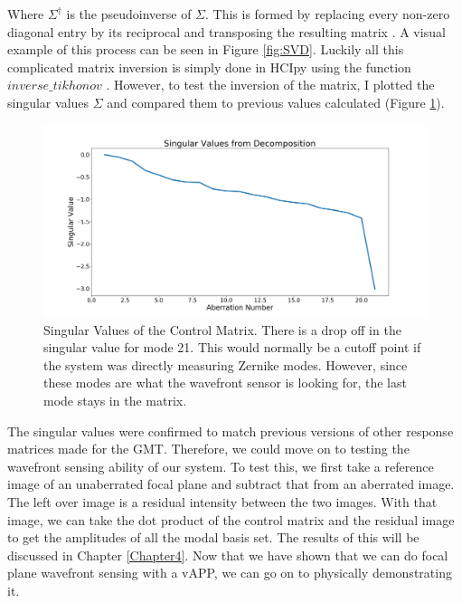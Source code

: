 Where $\Sigma^{\dagger}$ is the pseudoinverse of $\Sigma$.  This is formed by replacing every non-zero diagonal entry by
its reciprocal and transposing the resulting matrix \cite{Hestenes1958InversionResults}.  A visual example of this
process can be seen in Figure \ref{fig:SVD}. Luckily all this complicated matrix inversion is simply done in HCIpy using
the function $inverse\_tikhonov$ \cite{por2018hcipy}.  However, to test the inversion of the matrix, I plotted the
singular values $\Sigma$ and compared them to previous values calculated (Figure \ref{fig:SV}).




\begin{figure}[H]
    \centering
    \includegraphics[width = 14cm]{Figures/singular_values.png}
    \caption{Singular Values of the Control Matrix.  There is a drop off in the singular value for mode 21.  This would normally be a cutoff point if the system was directly measuring Zernike modes.  However, since these modes are what the wavefront sensor is looking for, the last mode stays in the matrix.}
    \label{fig:SV}
\end{figure}


The singular values were confirmed to match previous versions of other response matrices made for the GMT.  Therefore, we could move on to testing the wavefront sensing ability of our system.  To test this, we first take a reference image of an unaberrated focal plane and subtract that from an aberrated image.  The left over image is a residual intensity between the two images.  With that image, we can take the dot product of the control matrix and the residual image to get the amplitudes of all the modal basis set.  The results of this will be discussed in Chapter \ref{Chapter4}.  Now that we have shown that we can do focal plane wavefront sensing with a vAPP, we can go on to physically demonstrating it.

